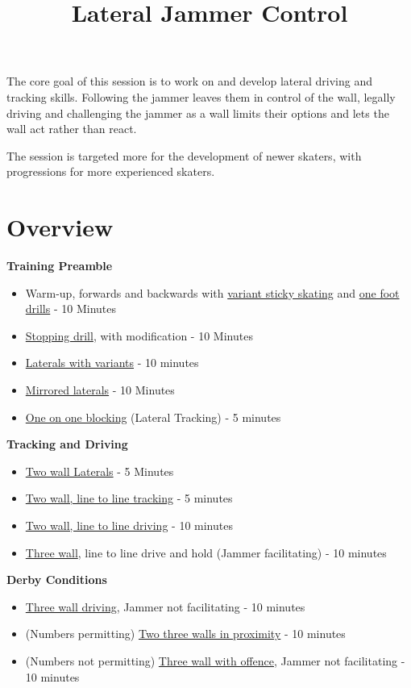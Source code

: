 \documentclass{journal}
\title{Lateral Jammer Control}
\author{}
\begin{document}
\maketitle
\noindent 

The core goal of this session is to work on and develop lateral driving and tracking skills. Following the jammer leaves them in control of the wall, legally driving and challenging the jammer as a wall limits their options and lets the wall act rather than react.        

The session is targeted more for the development of newer skaters, with progressions for more experienced skaters.        

\section*{Overview}

{\bf Training Preamble}
\begin{itemize}
\item Warm-up, forwards and backwards with \hyperref[drill:warmup:sticky_one_foot]{variant sticky skating} and \hyperref[drill:one_foot:serpentine]{one foot drills} - 10 Minutes
\item \hyperref[drill:stopping:jackie_daniels]{Stopping drill}, with modification - 10 Minutes 
\item \hyperref[drill:laterals]{Laterals with variants} - 10 minutes 
\item \hyperref[drill:laterals:mirrored]{Mirrored laterals} - 10 Minutes 
\item \hyperref[drill:blocking:one_on_one]{One on one blocking} (Lateral Tracking) - 5 minutes
\end{itemize}

\vspace{1cm}
\noindent 
{\bf Tracking and Driving}
\begin{itemize}
\item \hyperref[drill:two_wall:laterals]{Two wall Laterals} - 5 Minutes 
\item \hyperref[drill:two_wall:tracking]{Two wall, line to line tracking} - 5 minutes 
\item \hyperref[drill:two_wall:driving]{Two wall, line to line driving} - 10 minutes 
\item \hyperref[drill:three_wall:driving_facilitated]{Three wall}, line to line drive and hold (Jammer facilitating) - 10 minutes 
\end{itemize}

\vspace{1cm}
\noindent
{\bf Derby Conditions}
\begin{itemize}
\item \hyperref[drill:three_wall:driving]{Three wall driving}, Jammer not facilitating - 10 minutes 
\item (Numbers permitting) \hyperref[drill:three_wall:proximity]{Two three walls in proximity} - 10 minutes  
\item (Numbers not permitting) \hyperref[drill:three_wall:offence]{Three wall with offence}, Jammer not facilitating - 10 minutes 
\end{itemize}
\end{document}
